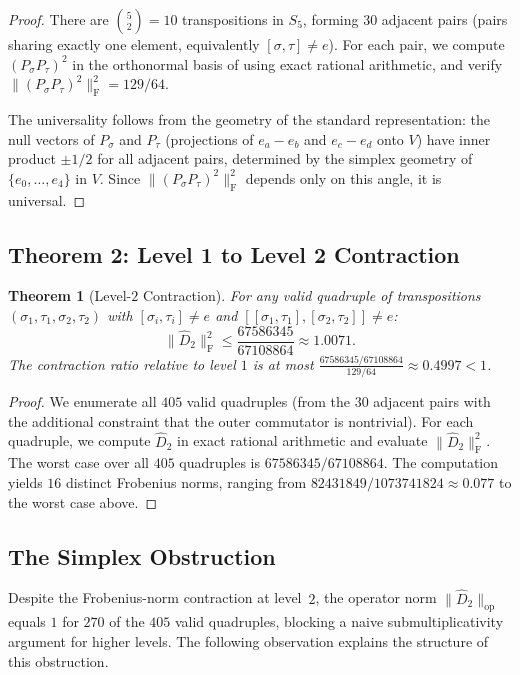 \documentclass[11pt]{article}
\newtheorem{theorem}{Theorem}[section]
\newcommand{\norm}[1]{\lVert #1 \rVert}
\newcommand{\frob}[1]{\norm{#1}_{\mathrm{F}}}
\newcommand{\opn}[1]{\norm{#1}_{\mathrm{op}}}
\newcommand{\Dhat}{\widehat{D}}
\begin{document}
\begin{proof}
There are $\binom{5}{2} = 10$ transpositions in $S_5$, forming $30$ adjacent
pairs (pairs sharing exactly one element, equivalently $[\sigma,\tau] \neq e$).
For each pair, we compute $(P_\sigma P_\tau)^2$ in the orthonormal basis of
 using exact rational arithmetic, and verify
$\frob{(P_\sigma P_\tau)^2}^2 = 129/64$.

The universality follows from the geometry of the standard representation:
the null vectors of $P_\sigma$ and $P_\tau$ (projections of $e_a - e_b$ and
$e_c - e_d$ onto $V$) have inner product $\pm 1/2$ for all adjacent pairs,
determined by the simplex geometry of $\{e_0, \ldots, e_4\}$ in $V$.
Since $\frob{(P_\sigma P_\tau)^2}^2$ depends only on this angle, it is
universal.
\end{proof}


\subsection{Theorem 2: Level 1 to Level 2 Contraction}

\begin{theorem}[Level-$2$ Contraction]
\label{thm:level12}
For any valid quadruple of transpositions $(\sigma_1, \tau_1, \sigma_2, \tau_2)$
with $[\sigma_i, \tau_i] \neq e$ and $[[\sigma_1,\tau_1], [\sigma_2,\tau_2]] \neq e$:
\[
\frob{\Dhat_2}^2 \leq \frac{67586345}{67108864} \approx 1.0071.
\]
The contraction ratio relative to level $1$ is at most
$\frac{67586345/67108864}{129/64} \approx 0.4997 < 1$.
\end{theorem}

\begin{proof}
We enumerate all $405$ valid quadruples (from the $30$ adjacent pairs with the
additional constraint that the outer commutator is nontrivial). For each quadruple,
we compute $\Dhat_2$ in exact rational arithmetic and evaluate $\frob{\Dhat_2}^2$.
The worst case over all $405$ quadruples is $67586345/67108864$.
The computation yields $16$ distinct Frobenius norms, ranging from
$82431849/1073741824 \approx 0.077$ to the worst case above.
\end{proof}


\subsection{The Simplex Obstruction}
\label{sec:simplex}

Despite the Frobenius-norm contraction at level~$2$, the operator norm
$\opn{\Dhat_2}$ equals $1$ for $270$ of the $405$ valid quadruples,
blocking a naive submultiplicativity argument for higher levels.
The following observation explains the structure of this obstruction.
\end{document}
